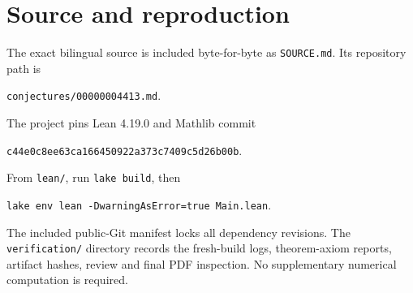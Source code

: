 \documentclass[11pt]{article}
\theoremstyle{remark}
\begin{document}
\section*{Source and reproduction}
The exact bilingual source is included byte-for-byte as
\texttt{SOURCE.md}. Its repository path is
\begin{center}\small\texttt{conjectures/00000004413.md}.\end{center}
The project pins Lean 4.19.0 and Mathlib commit
\begin{center}\small\texttt{c44e0c8ee63ca166450922a373c7409c5d26b00b}.\end{center}
From \texttt{lean/}, run \texttt{lake build}, then
\begin{center}\small\texttt{lake env lean -DwarningAsError=true Main.lean}.\end{center}
The included public-Git manifest locks all dependency revisions. The
\texttt{verification/} directory records the fresh-build logs,
theorem-axiom reports, artifact hashes, review and final PDF
inspection. No supplementary numerical computation is required.
\end{document}
